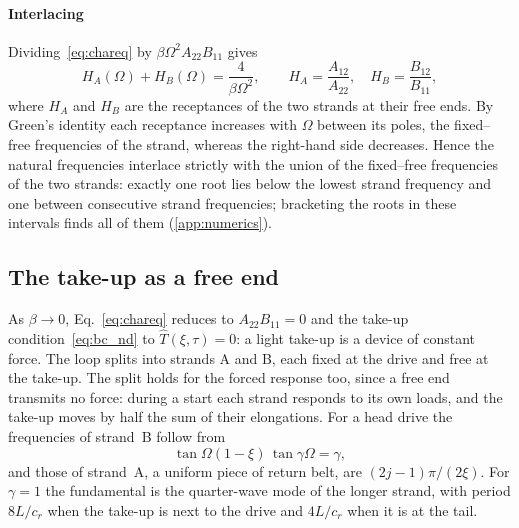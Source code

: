 \paragraph{Interlacing} Dividing~\eqref{eq:chareq} by $\beta\Omega^2A_{22}B_{11}$ gives
\begin{equation}\label{eq:receptance}
  H_A(\Omega)+H_B(\Omega)=\frac{4}{\beta\Omega^2},\qquad
  H_A=\frac{A_{12}}{A_{22}},\quad H_B=\frac{B_{12}}{B_{11}},
\end{equation}
where $H_A$ and $H_B$ are the receptances of the two strands at their free ends. By Green's
identity each receptance increases with $\Omega$ between its poles, the fixed--free
frequencies of the strand, whereas the right-hand side decreases. Hence the natural
frequencies interlace strictly with the union of the fixed--free frequencies of the two
strands: exactly one root lies below the lowest strand frequency and one between consecutive
strand frequencies; bracketing the roots in these intervals finds all of them
(\cref{app:numerics}).

\subsection{The take-up as a free end}\label{sec:freeend}

As $\beta\to0$, Eq.~\eqref{eq:chareq} reduces to $A_{22}B_{11}=0$ and the take-up
condition~\eqref{eq:bc_nd} to $\hat T(\xi,\tau)=0$: a light take-up is a device of constant
force. The loop splits into strands A and B, each fixed at the drive and free at the take-up.
The split holds for the forced response too, since a free end transmits no force: during a
start each strand responds to its own loads, and the take-up moves by half the sum of their
elongations. For a head drive the frequencies of strand~B follow from
\begin{equation}\label{eq:strandB}
  \tan\Omega(1-\xi)\,\tan\gamma\Omega=\gamma,
\end{equation}
and those of strand~A, a uniform piece of return belt, are $(2j-1)\pi/(2\xi)$. For $\gamma=1$
the fundamental is the quarter-wave mode of the longer strand, with period $8L/c_r$ when the
take-up is next to the drive and $4L/c_r$ when it is at the tail.


